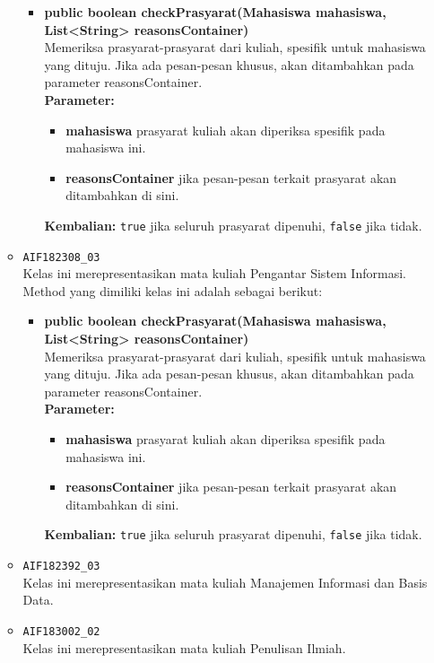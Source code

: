 \begin{enumerate}
\begin{itemize}
		\begin{itemize}
			\item \textbf{public boolean checkPrasyarat(Mahasiswa mahasiswa, List<String> reasonsContainer)}\\
			Memeriksa prasyarat-prasyarat dari kuliah, spesifik untuk mahasiswa yang dituju. Jika ada pesan-pesan khusus, akan ditambahkan pada parameter reasonsContainer.\\
			\textbf{Parameter:}
			\begin{itemize}
				\item \textbf{mahasiswa} prasyarat kuliah akan diperiksa spesifik pada mahasiswa ini.
				\item \textbf{reasonsContainer} jika pesan-pesan terkait prasyarat akan ditambahkan di sini.
			\end{itemize}
			\textbf{Kembalian:} \texttt{true} jika seluruh prasyarat dipenuhi, \texttt{false} jika tidak.
		\end{itemize}
		\item \texttt{AIF182308\_03} \\
		Kelas ini merepresentasikan mata kuliah Pengantar Sistem Informasi. Method yang dimiliki kelas ini adalah sebagai berikut: 
		\begin{itemize}
			\item \textbf{public boolean checkPrasyarat(Mahasiswa mahasiswa, List<String> reasonsContainer)}\\
			Memeriksa prasyarat-prasyarat dari kuliah, spesifik untuk mahasiswa yang dituju. Jika ada pesan-pesan khusus, akan ditambahkan pada parameter reasonsContainer.\\
			\textbf{Parameter:}
			\begin{itemize}
				\item \textbf{mahasiswa} prasyarat kuliah akan diperiksa spesifik pada mahasiswa ini.
				\item \textbf{reasonsContainer} jika pesan-pesan terkait prasyarat akan ditambahkan di sini.
			\end{itemize}
			\textbf{Kembalian:} \texttt{true} jika seluruh prasyarat dipenuhi, \texttt{false} jika tidak.
		\end{itemize}
		\item \texttt{AIF182392\_03} \\
		Kelas ini merepresentasikan mata kuliah Manajemen Informasi dan Basis Data.
		\item \texttt{AIF183002\_02} \\
		Kelas ini merepresentasikan mata kuliah Penulisan Ilmiah.

\end{itemize}
\end{enumerate}
